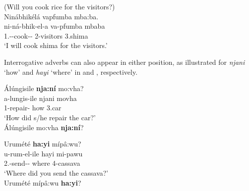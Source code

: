 \documentclass[output=paper]{langscibook}
\begin{document}
\z

\ea
\label{bkm:Ref121149078}\label{bkm:Ref141359654}
(Will you cook rice for the visitors?)\\
Ninábhikélá vapfumba mba:ba.\\
\gll
ni-ná-bhik-el-a  va-pfumba  mbaba\\
1\SG.\SM{}-\FUT{}-cook-\APPL{}-\FV{}  2-visitors  3.shima\\
\glt
‘I will cook shima for the visitors.’\\

\z

Interrogative adverbs can also appear in either position, as illustrated for \textit{njani} ‘how’ and \textit{hayi} ‘where’ in  and , respectively.

\ea\label{bkm:Ref141356959}
\ea
Álúngisile \textbf{nja:ní} mo:vha?\\
\gll
a-lungis-ile   njani  movha\\
1\SM{}-repair-\PFV{}  how  3.car\\
\glt
‘How did s/he repair the car?’\\


  \ex  Álúngisile mo:vha \textbf{nja:ní}?
\z
\z

\ea\label{bkm:Ref141356961}
\ea
Urumété \textbf{ha:yi} mípâ:wu?\\
\gll
u-rum-el-ile  hayi  mi-pawu\\
2\SG.\SM{}-send-\APPL{}-\PFV{}  where  4-cassava\\
\glt
‘Where did you send the cassava?’\\


  \ex  Urumété mípâ:wu \textbf{ha:yi}?
\z
\z
\end{document}
